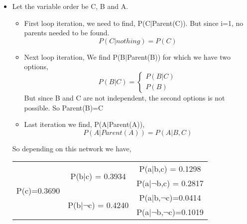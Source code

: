 \documentclass[letter, 11pt]{article}
\begin{document}
\begin{itemize}
    
    \item[(2)] Let the variable order be C, B and A.\\
    \begin{itemize}
        \item[-] First loop iteration, we need to find, P(C$|$Parent(C)). But since i=1, no parents needed to be found.
                \begin{equation*}
                    P(C|nothing) = P(C)
                \end{equation*}
        \item[-] Next loop iteration, We find P(B$|$Parent(B)) for which we have two options,
                \begin{equation*}
                    P(B|C) = \begin{cases}
                                P(B|C)\\
                                P(B)
                            \end{cases}
                \end{equation*}
                But since B and C are not independent, the second options is not possible. So Parent(B)=C
        \item[-] Last iteration we find, P(A$|$Parent(A)),
                \begin{equation*}
                    P(A|Parent(A)) = P(A|B,C) 
                \end{equation*}
    \end{itemize}
    So depending on this network we have,\\
    \begin{tabular}{ |c|c|c| }
        \hline
        \multirow{4}{*}{P(c)=0.3690} & \multirow{2}{*}{P(b$|$c) = 0.3934} & P(a$|$b,c) = 0.1298 \\\cline{3-3}
        & & P(a$|\neg$b,c) = 0.2817 \\ \cline{2-3}
        & \multirow{2}{*}{P(b$|\neg$c) = 0.4240} & P(a$|$b,$\neg$c)=0.0414 \\\cline{3-3}
        & & P(a$|\neg$b,$\neg$c)=0.1019 \\
        \hline
    \end{tabular}
    \begin{tikzpicture}[baseline={(current bounding box.east)},->,>=stealth',shorten >=1pt,auto,node distance=3cm,thick,main node/.style={circle,draw,font=\sffamily\Large\bfseries}]


\end{tikzpicture}
\end{itemize}
\end{document}

